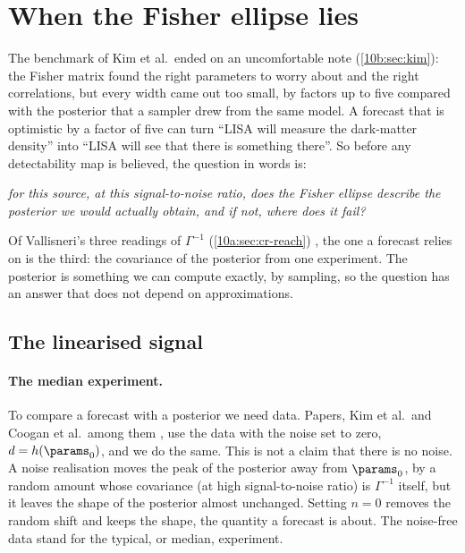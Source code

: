\section{When the Fisher ellipse lies}
\label{10b:sec:validity}

The benchmark of Kim et al.\ ended on an uncomfortable note (\cref{10b:sec:kim}): the Fisher matrix found the right
parameters to worry about and the right correlations, but every width came out too small, by factors up to five
compared with the posterior that a sampler drew from the same model. A forecast that is optimistic by a factor of
five can turn ``LISA will measure the dark-matter density'' into ``LISA will see that there is something there''. So
before any detectability map is believed, the question in words is:
\begin{center}
\emph{for this source, at this signal-to-noise ratio, does the Fisher ellipse describe the posterior we would actually
obtain, and if not, where does it fail?}
\end{center}
Of Vallisneri's three readings of $\Gamma^{-1}$ (\cref{10a:sec:cr-reach}) \cite{Vallisneri2008}, the one a forecast
relies on is the third: the covariance of the posterior from one experiment. The posterior is something we can compute
exactly, by sampling, so the question has an answer that does not depend on approximations.

\subsection{The linearised signal}
\label{10b:sec:lsa}

\paragraph{The median experiment.} To compare a forecast with a posterior we need data. Papers, Kim et al.\ and
Coogan et al.\ among them \cite{Kim2023,Coogan2022}, use the data with the noise set to zero, $d=h(\params_0)$, and we
do the same. This is not a claim that there is no noise. A noise realisation moves the peak of the posterior away
from $\params_0$, by a random amount whose covariance (at high signal-to-noise ratio) is $\Gamma^{-1}$ itself, but it
leaves the shape of the posterior almost unchanged. Setting $n=0$ removes the random shift and keeps the shape, the
quantity a forecast is about. The noise-free data stand for the typical, or median, experiment.

